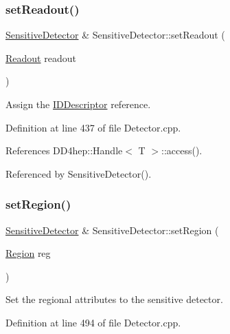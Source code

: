 \subsubsection{\texorpdfstring{set\+Readout()}{setReadout()}}
{\footnotesize\ttfamily \hyperlink{class_d_d4hep_1_1_geometry_1_1_sensitive_detector}{Sensitive\+Detector} \& Sensitive\+Detector\+::set\+Readout (\begin{DoxyParamCaption}\item[{\hyperlink{class_d_d4hep_1_1_geometry_1_1_readout}{Readout}}]{readout }\end{DoxyParamCaption})}



Assign the \hyperlink{class_d_d4hep_1_1_geometry_1_1_i_d_descriptor}{I\+D\+Descriptor} reference. 



Definition at line 437 of file Detector.\+cpp.



References D\+D4hep\+::\+Handle$<$ T $>$\+::access().



Referenced by Sensitive\+Detector().

\hypertarget{class_d_d4hep_1_1_geometry_1_1_sensitive_detector_a3fafb658e1cc5dbe7a1683e5420cce46}{}\label{class_d_d4hep_1_1_geometry_1_1_sensitive_detector_a3fafb658e1cc5dbe7a1683e5420cce46} 
\subsubsection{\texorpdfstring{set\+Region()}{setRegion()}}
{\footnotesize\ttfamily \hyperlink{class_d_d4hep_1_1_geometry_1_1_sensitive_detector}{Sensitive\+Detector} \& Sensitive\+Detector\+::set\+Region (\begin{DoxyParamCaption}\item[{\hyperlink{class_d_d4hep_1_1_geometry_1_1_region}{Region}}]{reg }\end{DoxyParamCaption})}



Set the regional attributes to the sensitive detector. 



Definition at line 494 of file Detector.\+cpp.



